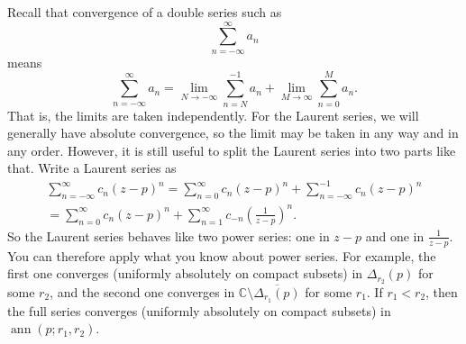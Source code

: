 \documentclass[12pt,openany]{book}
\newcommand{\ann}{\operatorname{ann}}
\newcommand{\C}{{\mathbb{C}}}
\theoremstyle{plain}
\theoremstyle{remark}
\theoremstyle{definition}
\theoremstyle{exercise}
\theoremstyle{example}
\begin{document}
Recall that convergence of a double series such as
\begin{equation*}
\sum_{n=-\infty}^{\infty} a_n
\end{equation*}
means
\begin{equation*}
\sum_{n=-\infty}^{\infty} a_n
=
\lim_{N\to -\infty}
\sum_{n=N}^{-1} a_n
+
\lim_{M\to \infty}
\sum_{n=0}^{M} a_n .
\end{equation*}
That is, the limits are taken independently.
For the Laurent series,
we will generally have absolute convergence,
so the limit may be taken in any way
and in any order.
However, it is still useful to split the Laurent series into two
parts like that.
Write a Laurent series as 
\begin{multline*}
\sum_{n=-\infty}^{\infty} c_n {(z-p)}^n
=
\sum_{n=0}^{\infty} c_n {(z-p)}^n
+
\sum_{n=-\infty}^{-1} c_n {(z-p)}^n
\\
=
\sum_{n=0}^{\infty} c_n {(z-p)}^n
+
\sum_{n=1}^{\infty} c_{-n} {\left(\frac{1}{z-p}\right)}^n .
\end{multline*}
So the Laurent series behaves like two power series: one in $z-p$ and one
in $\frac{1}{z-p}$.  You can therefore apply what you know about power
series.  For example, the first one converges (uniformly absolutely on compact subsets) in $\Delta_{r_2}(p)$
for some $r_2$,
and the second one converges in $\C \setminus \overline{\Delta_{r_1}(p)}$
for some $r_1$.
If $r_1 < r_2$, then the full series converges
(uniformly absolutely on compact subsets)
in $\ann(p;r_1,r_2)$.
\end{document}
